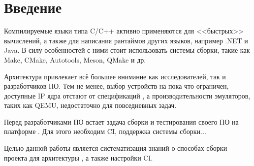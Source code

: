 
\section*{Введение}
\thispagestyle{withCompileDate}


Компилируемые языки типа C/C++ активно применяются для <<быстрых>> вычислений, а также для написания рантаймов других языков, например .NET и Java.
В силу особенностей  с ними стоит использовать системы сборки, такие как Make, CMake, Autotools, Meson, QMake и др.

Архитектура \riscv{} привлекает всё большее внимание как исследователей, так и разработчиков ПО.
Тем не менее, выбор устройств на \riscv{} пока что ограничен, доступные IP ядра отстают от спецификаций , а производительности эмуляторов, таких как QEMU, недостаточно для повседневных задач.

Перед разработчиками ПО встает задача сборки и тестирования своего ПО на платформе \riscv{}.
Для этого необходим CI, поддержка системы сборки...

Целью данной работы является систематизация знаний о способах сборки проекта для архитектуры \riscv{}, а также настройки CI.
